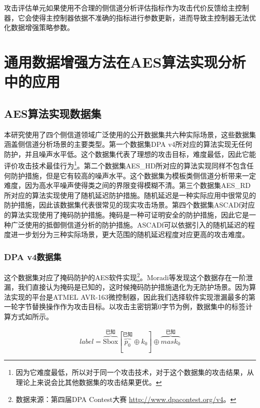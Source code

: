{	攻击评估单元如果使用不合理的侧信道分析评估指标作为攻击代价反馈给主控制器，它会使得主控制器依据不准确的指标进行参数更新，进而导致主控制器无法优化数据增强策略参数。
	\section{通用数据增强方法在AES算法实现分析中的应用}\label{sec:intoreal}
	\subsection{AES算法实现数据集}
	
	本研究使用了四个侧信道领域广泛使用的公开数据集共六种实际场景，这些数据集涵盖侧信道分析场景的主要类型。第一个数据集DPA v4所对应的算法实现无任何防护，并且噪声水平低。这个数据集代表了理想的攻击目标，难度最低，因此它能评价攻击技术最佳行为\footnote{因为它难度最低，所以对于同一个攻击技术，对于这个数据集的攻击结果，从理论上来说会比其他数据集的攻击结果更优。}。第二个数据集AES\_HD所对应的算法实现同样不包含任何防护措施，但是它有较高的噪声水平。这个数据集为模板类侧信道分析带来一定难度，因为高水平噪声使得类之间的界限变得模糊不清。第三个数据集AES\_RD所对应的算法实现使用了随机延迟防护措施。随机延迟是一种实际应用中很常见的防护措施，因此该数据集代表很常见的现实攻击场景。第四个数据集ASCADf对应的算法实现使用了掩码防护措施。掩码是一种可证明安全的防护措施，因此它是一种广泛使用的抵御侧信道分析的防护措施。ASCADf可以依据引入的随机延迟的程度进一步划分为三种实际场景，更大范围的随机延迟程度对应更高的攻击难度。
	
	\subsubsection{DPA v4数据集}
	
	这个数据集对应了掩码防护的AES软件实现\footnote{数据来源：第四届DPA Contest大赛 \href{http://www.dpacontest.org/v4}{http://www.dpacontest.org/v4}。}。Moradi等\citep{Moradi14}发现这个数据存在一阶泄漏，我们直接认为掩码是已知的，这时候掩码防护措施退化为无防护场景。因为算法实现的平台是ATMEL AVR-163微控制器，因此我们选择软件实现泄漏最多的第一轮字节替换操作作为攻击目标。以攻击主密钥第0字节为例，数据集中的标签计算方式如所示。
	
	\begin{equation}\label{eq:dpav4model}
		label=\overbrace{\mathrm{Sbox}}^{\mbox{已知}}[\overbrace{p_0}^{\mbox{已知}}\oplus k_0]\oplus \overbrace{mask_0}^{\mbox{已知}}
	\end{equation}
	
}
